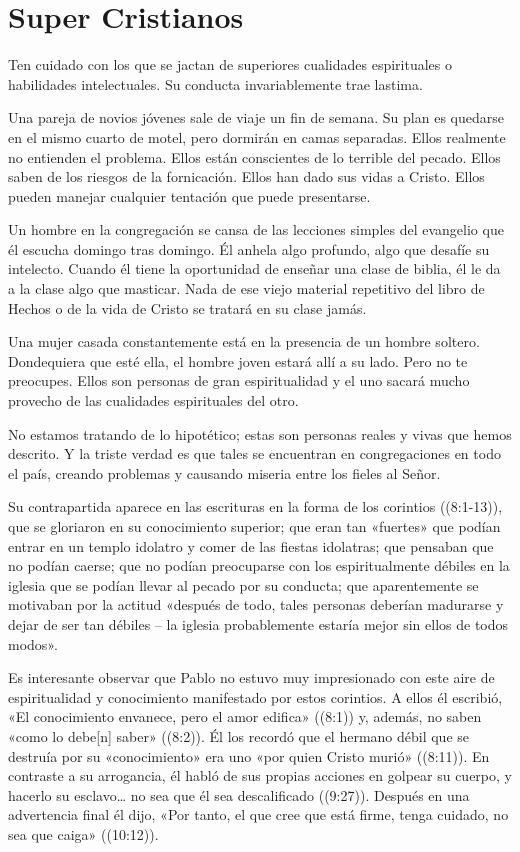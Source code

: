 \documentclass[12pt, twoside, openright]{book}
\begin{document}
\section{Super Cristianos}
Ten cuidado con los que se jactan de superiores cualidades espirituales o habilidades intelectuales. Su conducta invariablemente trae lastima. 

Una pareja de novios jóvenes sale de viaje un fin de semana. Su plan es quedarse en el mismo cuarto de motel, pero dormirán en camas separadas. Ellos realmente no entienden el problema. Ellos están conscientes de lo terrible del pecado. Ellos saben de los riesgos de la fornicación. Ellos han dado sus vidas a Cristo. Ellos pueden manejar cualquier tentación que puede presentarse. 

Un hombre en la congregación se cansa de las lecciones simples del evangelio que él escucha domingo tras domingo. Él anhela algo profundo, algo que desafíe su intelecto. Cuando él tiene la oportunidad de enseñar una clase de biblia, él le da a la clase algo que masticar. Nada de ese viejo material repetitivo del libro de Hechos o de la vida de Cristo se tratará en su clase jamás. 

Una mujer casada constantemente está en la presencia de un hombre soltero. Dondequiera que esté ella, el hombre joven estará allí a su lado. Pero no te preocupes. Ellos son personas de gran espiritualidad y el uno sacará mucho provecho de las cualidades espirituales del otro.

No estamos tratando de lo hipotético; estas son personas reales y vivas que hemos descrito. Y la triste verdad es que tales se encuentran en congregaciones en todo el país, creando problemas y causando miseria entre los fieles al Señor. 

Su contrapartida aparece en las escrituras en la forma de los corintios ((8:1-13)), que se gloriaron en su conocimiento superior; que eran tan «fuertes» que podían entrar en un templo idolatro y comer de las fiestas idolatras; que pensaban que no podían caerse; que no podían preocuparse con los espiritualmente débiles en la iglesia que se podían llevar al pecado por su conducta; que aparentemente se motivaban por la actitud «después de todo, tales personas deberían madurarse y dejar de ser tan débiles – la iglesia probablemente estaría mejor sin ellos de todos modos».

Es interesante observar que Pablo no estuvo muy impresionado con este aire de espiritualidad y conocimiento manifestado por estos corintios. A ellos él escribió, «El conocimiento envanece, pero el amor edifica» ((8:1)) y, además, no saben «como lo debe[n] saber» ((8:2)). Él los recordó que el hermano débil que se destruía por su «conocimiento» era uno «por quien Cristo murió» ((8:11)). En contraste a su arrogancia, él habló de sus propias acciones en golpear su cuerpo, y hacerlo su esclavo… no sea que él sea descalificado ((9:27)). Después en una advertencia final él dijo, «Por tanto, el que cree que está firme, tenga cuidado, no sea que caiga» ((10:12)).
\end{document}
